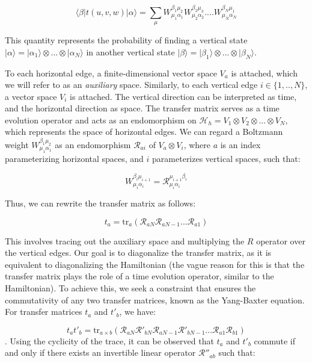 \documentclass[11pt]{article}
\theoremstyle{definition}
\begin{document}
\[\langle\beta| t(u,v,w)|\alpha\rangle=\sum_{\mu}W_{\mu_{1}\alpha_{1}}^{\beta_1\mu_2}W_{\mu_{2}\alpha_{2}}^{\beta_2\mu_3}....W_{\mu_{N}\alpha_{N}}^{\beta_N\mu_1}\]

This quantity represents the probability of finding a vertical state \(|\alpha\rangle=|\alpha_1\rangle\otimes...\otimes|\alpha_N\rangle\) in another vertical state \(|\beta\rangle=|\beta_1\rangle\otimes...\otimes|\beta_N\rangle\).

To each horizontal edge, a finite-dimensional vector space \(V_{a}\) is attached, which we will refer to as an \textit{auxiliary} space. Similarly, to each vertical edge \(i\in\{1,..,N\}\), a vector space \(V_{i}\) is attached. The vertical direction can be interpreted as time, and the horizontal direction as space. The transfer matrix serves as a time evolution operator and acts as an endomorphism on \(\mathcal{H}_{h}=V_{1}\otimes V_{2}\otimes...\otimes V_{N}\), which represents the space of horizontal edges. We can regard a Boltzmann weight \(W_{\mu_{1}\alpha_{1}}^{\beta_1\mu_2}\) as an endomorphism \(\mathcal{R}_{ai}\) of \(V_{a}\otimes V_{i}\), where \(a\) is an index parameterizing horizontal spaces, and \(i\) parameterizes vertical spaces, such that:

\[W_{\mu_{i}\alpha_{i}}^{\beta_i\mu_{i+1}}=\mathcal{R}_{\mu_{i}\alpha_{i}}^{\mu_{i+1}\beta_{i}}\]

Thus, we can rewrite the transfer matrix as follows:

\[ t_{a}=\text{tr}_{a}\left(\mathcal{R}_{aN}\mathcal{R}_{aN-1}...\mathcal{R}_{a1}\right) \]

This involves tracing out the auxiliary space and multiplying the \(R\) operator over the vertical edges. Our goal is to diagonalize the transfer matrix, as it is equivalent to diagonalizing the Hamiltonian (the vague reason for this is that the transfer matrix plays the role of a time evolution operator, similar to the Hamiltonian). To achieve this, we seek a constraint that ensures the commutativity of any two transfer matrices, known as the Yang-Baxter equation. For transfer matrices \(t_{a}\) and \(t'_{b}\), we have:

\[t_{a}t'_{b}=\text{tr}_{a\times b}\left(\mathcal{R}_{aN}\mathcal{R}'_{bN}\mathcal{R}_{aN-1}\mathcal{R}'_{bN-1}...\mathcal{R}_{a1}\mathcal{R}_{b1}\right)\].
Using the cyclicity of the trace, it can be observed that \(t_{a}\) and \(t'_{b}\) commute if and only if there exists an invertible linear operator \(\mathcal{R}''_{ab}\) such that:
\end{document}
